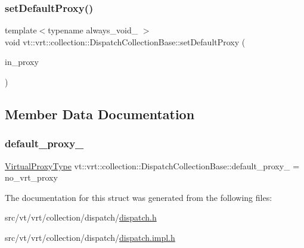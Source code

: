 \mbox{\label{structvt_1_1vrt_1_1collection_1_1_dispatch_collection_base_a3c5ad977c57108fdcfcc3c2b443428e3}} 
\subsubsection{\texorpdfstring{set\+Default\+Proxy()}{setDefaultProxy()}}
{\footnotesize\ttfamily template$<$typename always\+\_\+void\+\_\+ $>$ \\
void vt\+::vrt\+::collection\+::\+Dispatch\+Collection\+Base\+::set\+Default\+Proxy (\begin{DoxyParamCaption}\item[{\hyperlink{namespacevt_a1b417dd5d684f045bb58a0ede70045ac}{Virtual\+Proxy\+Type} const \&}]{in\+\_\+proxy }\end{DoxyParamCaption})}



\subsection{Member Data Documentation}
\mbox{\label{structvt_1_1vrt_1_1collection_1_1_dispatch_collection_base_ad192b793a3929262a6b44951b628d215}} 
\subsubsection{\texorpdfstring{default\+\_\+proxy\+\_\+}{default\_proxy\_}}
{\footnotesize\ttfamily \hyperlink{namespacevt_a1b417dd5d684f045bb58a0ede70045ac}{Virtual\+Proxy\+Type} vt\+::vrt\+::collection\+::\+Dispatch\+Collection\+Base\+::default\+\_\+proxy\+\_\+ = no\+\_\+vrt\+\_\+proxy\hspace{0.3cm}{\ttfamily [private]}}



The documentation for this struct was generated from the following files\+:\begin{DoxyCompactItemize}
\item 
src/vt/vrt/collection/dispatch/\hyperlink{src_2vt_2vrt_2collection_2dispatch_2dispatch_8h}{dispatch.\+h}\item 
src/vt/vrt/collection/dispatch/\hyperlink{src_2vt_2vrt_2collection_2dispatch_2dispatch_8impl_8h}{dispatch.\+impl.\+h}\end{DoxyCompactItemize}
